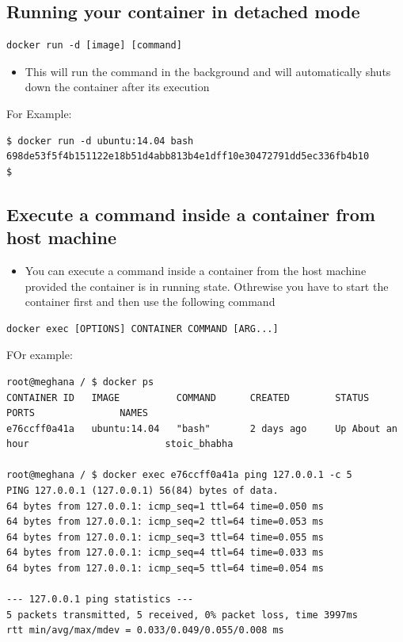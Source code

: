 \documentclass[11pt]{article}
\begin{document}
\subsection{Running your container in detached mode}
\label{sec:orgheadline15}
\begin{verbatim}
docker run -d [image] [command]
\end{verbatim}
\begin{itemize}
\item This will run the command in the background and will automatically shuts down
the container after its execution
\end{itemize}

For Example:
\begin{verbatim}
$ docker run -d ubuntu:14.04 bash
698de53f5f4b151122e18b51d4abb813b4e1dff10e30472791dd5ec336fb4b10
$
\end{verbatim}
\subsection{Execute a command inside a container from host machine}
\label{sec:orgheadline16}
\begin{itemize}
\item You can execute a command inside a container from the host machine
provided the container is in running state. Othrewise you have to start
the container first and then use the following command
\end{itemize}
\begin{verbatim}
docker exec [OPTIONS] CONTAINER COMMAND [ARG...]
\end{verbatim}
FOr example:
\begin{verbatim}
root@meghana / $ docker ps
CONTAINER ID   IMAGE          COMMAND      CREATED        STATUS              PORTS               NAMES
e76ccff0a41a   ubuntu:14.04   "bash"       2 days ago     Up About an hour                        stoic_bhabha

root@meghana / $ docker exec e76ccff0a41a ping 127.0.0.1 -c 5
PING 127.0.0.1 (127.0.0.1) 56(84) bytes of data.
64 bytes from 127.0.0.1: icmp_seq=1 ttl=64 time=0.050 ms
64 bytes from 127.0.0.1: icmp_seq=2 ttl=64 time=0.053 ms
64 bytes from 127.0.0.1: icmp_seq=3 ttl=64 time=0.055 ms
64 bytes from 127.0.0.1: icmp_seq=4 ttl=64 time=0.033 ms
64 bytes from 127.0.0.1: icmp_seq=5 ttl=64 time=0.054 ms

--- 127.0.0.1 ping statistics ---
5 packets transmitted, 5 received, 0% packet loss, time 3997ms
rtt min/avg/max/mdev = 0.033/0.049/0.055/0.008 ms
\end{verbatim}
\end{document}
